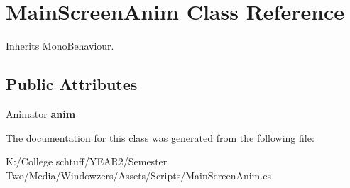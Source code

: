 \hypertarget{class_main_screen_anim}{}\section{Main\+Screen\+Anim Class Reference}
\label{class_main_screen_anim}


Inherits Mono\+Behaviour.

\subsection*{Public Attributes}
\begin{DoxyCompactItemize}
\item 
\mbox{\label{class_main_screen_anim_aeaa49a713c26744bba809aa171a40a42}} 
Animator {\bfseries anim}
\end{DoxyCompactItemize}


The documentation for this class was generated from the following file\+:\begin{DoxyCompactItemize}
\item 
K\+:/\+College schtuff/\+Y\+E\+A\+R2/\+Semester Two/\+Media/\+Windowzers/\+Assets/\+Scripts/Main\+Screen\+Anim.\+cs\end{DoxyCompactItemize}
